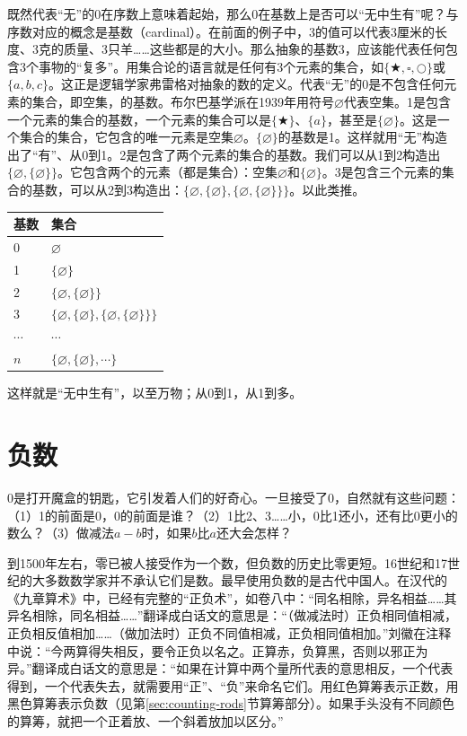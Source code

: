 \documentclass[b5paper]{ctexart}
\begin{document}
既然代表“无”的0在序数上意味着起始，那么0在基数上是否可以“无中生有”呢？与序数对应的概念是基数（cardinal）。在前面的例子中，3的值可以代表3厘米的长度、3克的质量、3只羊……这些都是的大小。那么抽象的基数3，应该能代表任何包含3个事物的“复多”。用集合论的语言就是任何有3个元素的集合，如$\{\bigstar, \square, \bigcirc \}$或$\{a, b, c\}$。这正是逻辑学家弗雷格对抽象的数的定义。代表“无”的0是不包含任何元素的集合，即空集，的基数。布尔巴基学派在1939年用符号$\varnothing$代表空集。1是包含一个元素的集合的基数，一个元素的集合可以是$\{ \bigstar \}$、$\{ a \}$，甚至是$\{ \varnothing \}$。这是一个集合的集合，它包含的唯一元素是空集$\varnothing$。$\{ \varnothing \}$的基数是1。这样就用“无”构造出了“有”、从0到1。2是包含了两个元素的集合的基数。我们可以从1到2构造出$\{ \varnothing, \{ \varnothing \} \}$。它包含两个的元素（都是集合）：空集$\varnothing$和$\{ \varnothing \}$。3是包含三个元素的集合的基数，可以从2到3构造出：$\{ \varnothing, \{ \varnothing \}, \{ \varnothing, \{ \varnothing \} \}\}$。以此类推。

\begin{tabular}{l|l}
  基数 & 集合 \\
  \hline
  0 & $\varnothing$ \\
  1 & $\{ \varnothing \}$ \\
  2 & $\{ \varnothing, \{ \varnothing \} \}$ \\
  3 & $\{ \varnothing, \{ \varnothing \}, \{ \varnothing, \{ \varnothing \} \}\}$ \\
  $\cdots$ & $\cdots$ \\
  $n$ & $\{ \varnothing, \{ \varnothing \}, \cdots \}$
\end{tabular}

这样就是“无中生有”，以至万物；从0到1，从1到多。

\section{负数}

0是打开魔盒的钥匙，它引发着人们的好奇心。一旦接受了0，自然就有这些问题：（1）1的前面是0，0的前面是谁？（2）1比2、3……小，0比1还小，还有比0更小的数么？（3）做减法$a -b$时，如果$b$比$a$还大会怎样？

到1500年左右，零已被人接受作为一个数，但负数的历史比零更短。16世纪和17世纪的大多数数学家并不承认它们是数。最早使用负数的是古代中国人。在汉代的《九章算术》中，已经有完整的“正负术”，如卷八中：“同名相除，异名相益……其异名相除，同名相益……”翻译成白话文的意思是：“（做减法时）正负相同值相减，正负相反值相加……（做加法时）正负不同值相减，正负相同值相加。”刘徽在注释中说：“今两算得失相反，要令正负以名之。正算赤，负算黑，否则以邪正为异。”翻译成白话文的意思是：“如果在计算中两个量所代表的意思相反，一个代表得到，一个代表失去，就需要用“正”、“负”来命名它们。用红色算筹表示正数，用黑色算筹表示负数（见第\ref{sec:counting-rods}节算筹部分）。如果手头没有不同颜色的算筹，就把一个正着放、一个斜着放加以区分。”\cite{Jiuzhang-2009}
\end{document}
